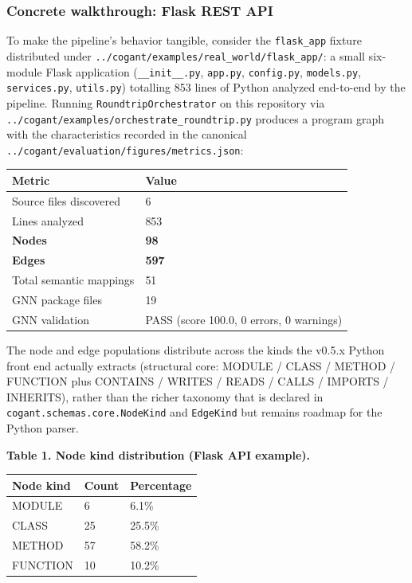 \documentclass[
]{article}
\newcounter{none} %
\begin{document}
\subsubsection{Concrete walkthrough: Flask REST
API}\label{concrete-walkthrough-flask-rest-api}

To make the pipeline's behavior tangible, consider the
\texttt{flask\_app} fixture distributed under
\texttt{../cogant/examples/real\_world/flask\_app/}: a small six-module
Flask application (\texttt{\_\_init\_\_.py}, \texttt{app.py},
\texttt{config.py}, \texttt{models.py}, \texttt{services.py},
\texttt{utils.py}) totalling 853 lines of Python analyzed end-to-end by
the pipeline. Running \texttt{RoundtripOrchestrator} on this repository
via \texttt{../cogant/examples/orchestrate\_roundtrip.py} produces a
program graph with the characteristics recorded in the canonical
\texttt{../cogant/evaluation/figures/metrics.json}:

{\def\LTcaptype{none} %
\begin{longtable}[]{@{}ll@{}}
\toprule\noalign{}
Metric & Value \\
\midrule\noalign{}
\endhead
\bottomrule\noalign{}
\endlastfoot
Source files discovered & 6 \\
Lines analyzed & 853 \\
\textbf{Nodes} & \textbf{98} \\
\textbf{Edges} & \textbf{597} \\
Total semantic mappings & 51 \\
GNN package files & 19 \\
GNN validation & PASS (score 100.0, 0 errors, 0 warnings) \\
\end{longtable}
}

The node and edge populations distribute across the kinds the v0.5.x
Python front end actually extracts (structural core: MODULE / CLASS /
METHOD / FUNCTION plus CONTAINS / WRITES / READS / CALLS / IMPORTS /
INHERITS), rather than the richer taxonomy that is declared in
\texttt{cogant.schemas.core.NodeKind} and \texttt{EdgeKind} but remains
roadmap for the Python parser.

\textbf{Table 1. Node kind distribution (Flask API example).}

{\def\LTcaptype{none} %
\begin{longtable}[]{@{}lll@{}}
\toprule\noalign{}
Node kind & Count & Percentage \\
\midrule\noalign{}
\endhead
\bottomrule\noalign{}
\endlastfoot
MODULE & 6 & 6.1\% \\
CLASS & 25 & 25.5\% \\
METHOD & 57 & 58.2\% \\
FUNCTION & 10 & 10.2\% \\
\end{longtable}
}
\end{document}
